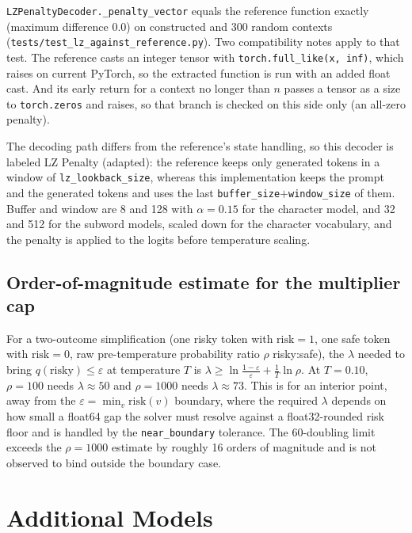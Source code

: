 \documentclass[11pt]{article}
\newcommand{\risk}{\mathrm{risk}}
\begin{document}
\texttt{LZPenaltyDecoder.\_penalty\_vector} equals the reference function exactly (maximum difference $0.0$) on constructed and 300 random contexts (\texttt{tests/test\_\allowbreak{}lz\_\allowbreak{}against\_\allowbreak{}reference.py}). Two compatibility notes apply to that test. The reference casts an integer tensor with \texttt{torch.full\_like(x, inf)}, which raises on current PyTorch, so the extracted function is run with an added float cast. And its early return for a context no longer than $n$ passes a tensor as a size to \texttt{torch.zeros} and raises, so that branch is checked on this side only (an all-zero penalty).

The decoding path differs from the reference's state handling, so this decoder is labeled LZ Penalty (adapted): the reference keeps only generated tokens in a window of \texttt{lz\_\allowbreak{}lookback\_\allowbreak{}size}, whereas this implementation keeps the prompt and the generated tokens and uses the last \texttt{buffer\_\allowbreak{}size}$+$\texttt{window\_\allowbreak{}size} of them. Buffer and window are 8 and 128 with $\alpha{=}0.15$ for the character model, and 32 and 512 for the subword models, scaled down for the character vocabulary, and the penalty is applied to the logits before temperature scaling.

\subsection{Order-of-magnitude estimate for the multiplier cap}
\label{ssec:lambda-estimate}
\label{app:lambda-estimate}
For a two-outcome simplification (one risky token with $\risk{=}1$, one safe token with $\risk{=}0$, raw pre-temperature probability ratio $\rho$ risky:safe), the $\lambda$ needed to bring $q(\text{risky})\le\varepsilon$ at temperature $T$ is $\lambda\ge\ln\frac{1-\varepsilon}{\varepsilon}+\frac{1}{T}\ln\rho$. At $T{=}0.10$, $\rho{=}100$ needs $\lambda\approx50$ and $\rho{=}1000$ needs $\lambda\approx73$. This is for an interior point, away from the $\varepsilon=\min_v\risk(v)$ boundary, where the required $\lambda$ depends on how small a float64 gap the solver must resolve against a float32-rounded risk floor and is handled by the \texttt{near\_\allowbreak{}boundary} tolerance. The 60-doubling limit exceeds the $\rho{=}1000$ estimate by roughly 16 orders of magnitude and is not observed to bind outside the boundary case.

\section{Additional Models}
\label{sec:generalization}
\end{document}
